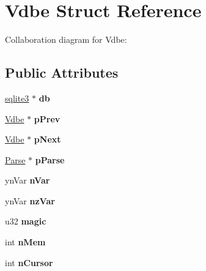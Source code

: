 \hypertarget{structVdbe}{}\section{Vdbe Struct Reference}
\label{structVdbe}


Collaboration diagram for Vdbe\+:
\subsection*{Public Attributes}
\begin{DoxyCompactItemize}
\item 
\hyperlink{structsqlite3}{sqlite3} $\ast$ {\bfseries db}\hypertarget{structVdbe_a495366101a593999f4d2ed905e839029}{}\label{structVdbe_a495366101a593999f4d2ed905e839029}

\item 
\hyperlink{structVdbe}{Vdbe} $\ast$ {\bfseries p\+Prev}\hypertarget{structVdbe_a2afc3b6cd2f5b38d991148b809b3c53f}{}\label{structVdbe_a2afc3b6cd2f5b38d991148b809b3c53f}

\item 
\hyperlink{structVdbe}{Vdbe} $\ast$ {\bfseries p\+Next}\hypertarget{structVdbe_a9d52c1a2d64f132c6994eeac00063df9}{}\label{structVdbe_a9d52c1a2d64f132c6994eeac00063df9}

\item 
\hyperlink{structParse}{Parse} $\ast$ {\bfseries p\+Parse}\hypertarget{structVdbe_a90fc4cdcc206a8f62c18e860b78f5cda}{}\label{structVdbe_a90fc4cdcc206a8f62c18e860b78f5cda}

\item 
yn\+Var {\bfseries n\+Var}\hypertarget{structVdbe_a2acd8f1fa65e19eb48fc62ddb6cb7569}{}\label{structVdbe_a2acd8f1fa65e19eb48fc62ddb6cb7569}

\item 
yn\+Var {\bfseries nz\+Var}\hypertarget{structVdbe_aacefce2bccaad230767304a56986007d}{}\label{structVdbe_aacefce2bccaad230767304a56986007d}

\item 
u32 {\bfseries magic}\hypertarget{structVdbe_a01c61f8cafa6ad3eaafcc85c6f53f8ef}{}\label{structVdbe_a01c61f8cafa6ad3eaafcc85c6f53f8ef}

\item 
int {\bfseries n\+Mem}\hypertarget{structVdbe_a10a19309607617a75d3722219d3c7615}{}\label{structVdbe_a10a19309607617a75d3722219d3c7615}

\item 
int {\bfseries n\+Cursor}\hypertarget{structVdbe_aa12a6a1075311bd5d89bc69eaefc6351}{}\label{structVdbe_aa12a6a1075311bd5d89bc69eaefc6351}


\end{DoxyCompactItemize}
